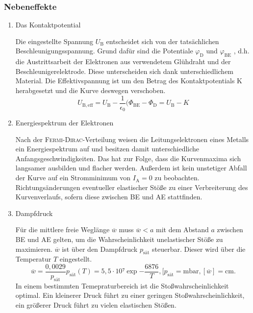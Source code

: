\subsubsection{Nebeneffekte}
\begin{enumerate}
\item{Das Kontaktpotential}

Die eingestellte Spannung $U_\mathup{B}$ entscheidet sich von der tatsächlichen Beschleunigungsspannung. 
Grund dafür sind die Potentiale $\varphi_\mathup{D}$ und $\varphi_\mathup{BE}$ , d.h. die Austrittsarbeit der Elektronen aus verwendetem Glühdraht und der Beschleunigerelektrode. 
Diese unterscheiden sich dank unterschiedlichem Material.
Die Effektivspannung ist um den Betrag des Kontaktpotentials K herabgesetzt und die Kurve deswegen verschoben.
\begin{equation}
	U_\mathup{B,eff}=U_\mathup{B}-\frac{1}{\epsilon_0}(\Phi_	\mathup{BE}-\Phi_\mathup{D}=U_\mathup{B}-K
\end{equation}
\item{Energiespektrum der Elektronen}

Nach der \textsc{Fermi}-\textsc{Dirac}-Verteilung weisen die Leitungselektronen eines Metalls ein Energiespektrum auf und besitzen damit unterschiedliche Anfangsgeschwindigkeiten.
Das hat zur Folge, dass die Kurvenmaxima sich langsamer ausbilden und flacher werden. 
Außerdem ist kein unstetiger Abfall der Kurve auf ein Stromminimum von $I_\mathup{A}=0$ zu beobachten.
Richtungsänderungen eventueller elastischer Stöße zu einer Verbreiterung des Kurvenverlaufs, sofern diese zwischen BE und AE stattfinden. 
\item{Dampfdruck}

Für die mittlere freie Weglänge $\overline{w}$ muss $\overline{w} < a$ mit dem Abstand $a$ zwischen BE und AE gelten, um die Wahrscheinlichkeit unelastischer Stöße zu maximieren. 
$\overline{w}$ ist über den Dampfdruck $p_\mathup{sät}$ steuerbar. Dieser wird über die Temperatur $T$ eingestellt. 
\begin{equation}
	\overline{w}=\frac{0,0029}{p_\mathup{sät}}
	p_\mathup{sät}(T)=5,5\cdot 10⁷\exp{-\frac{6876}{T}}, [p_\mathup{sät}=\si{\milli\bar}, [\overline{w}]=\si{\centi\meter}.
\end{equation}
In einem bestimmten Temepraturbereich ist die Stoßwahrscheinlichkeit optimal.
Ein kleinerer Druck führt zu einer geringen Stoßwahrscheinlichkeit, ein größerer Druck führt zu vielen elastischen Stößen.
\end{enumerate}
